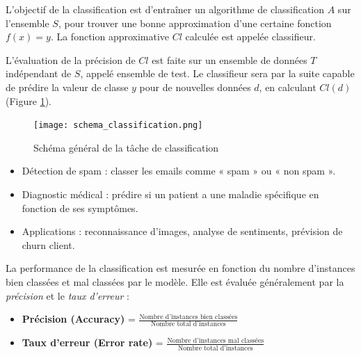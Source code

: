 \documentclass[a4paper,14pt]{article}
\begin{document}
            L’objectif de la classification est d’entraîner un algorithme de classification $A$ sur l’ensemble $S$, pour trouver une bonne approximation d’une certaine fonction $f(x) = y$. La fonction approximative $Cl$ calculée est appelée classifieur. 
            
            L’évaluation de la précision de $Cl$ est faite sur un ensemble de données $T$ indépendant de $S$, appelé ensemble de test. Le classifieur sera par la suite capable de prédire la valeur de classe $y$ pour de nouvelles données $d$, en calculant $Cl(d)$ (Figure \ref{fig:classification}).
            
            \begin{figure}[h]
                \centering
                \texttt{[image: schema\_classification.png]}
                \caption{Schéma général de la tâche de classification}
                \label{fig:classification}
            \end{figure}
        

        \begin{itemize}
            \item  Détection de spam : classer les emails comme « spam » ou « non spam ».
            \item  Diagnostic médical : prédire si un patient a une maladie spécifique en fonction de ses symptômes.
            \item  Applications : reconnaissance d’images, analyse de sentiments, prévision de churn client.
        \end{itemize}


        La performance de la classification est mesurée en fonction du nombre d'instances bien classées et mal classées par le modèle. Elle est évaluée généralement par la \textit{précision} et le \textit{taux d'erreur} :
        
        \begin{itemize}
            \item \textbf{Précision (Accuracy)} = $\frac{\text{Nombre d'instances bien classées}}{\text{Nombre total d'instances}}$
            \item \textbf{Taux d'erreur (Error rate)} = $\frac{\text{Nombre d'instances mal classées}}{\text{Nombre total d'instances}}$
        \end{itemize}
        
\end{document}
